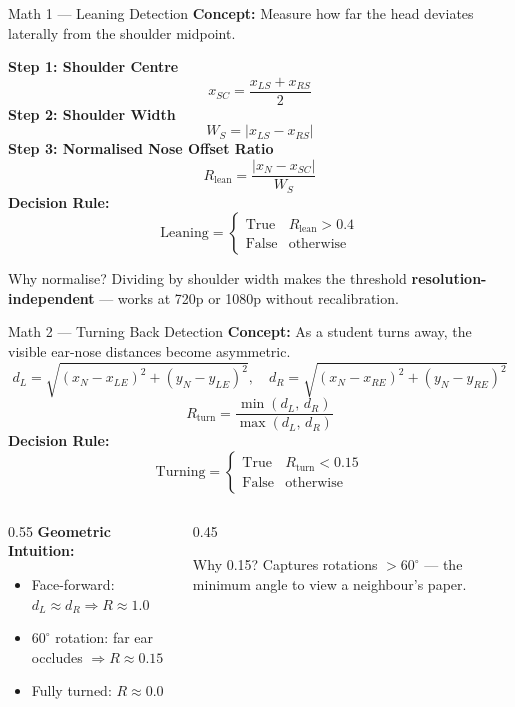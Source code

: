 \documentclass{beamer}
\begin{document}
\begin{frame}{Math 1 --- Leaning Detection}
\textbf{Concept:} Measure how far the head deviates laterally from the shoulder midpoint.
\vspace{0.25cm}

\textbf{Step 1: Shoulder Centre}
\[ x_{SC} = \frac{x_{LS} + x_{RS}}{2} \]
\textbf{Step 2: Shoulder Width}
\[ W_S = |x_{LS} - x_{RS}| \]
\textbf{Step 3: Normalised Nose Offset Ratio}
\[ \boxed{R_{\text{lean}} = \frac{|x_N - x_{SC}|}{W_S}} \]
\textbf{Decision Rule:}
\[ \text{Leaning} = \begin{cases} \text{True} & R_{\text{lean}} > 0.4 \\ \text{False} & \text{otherwise} \end{cases} \]
\begin{alertblock}{Why normalise?}
Dividing by shoulder width makes the threshold \textbf{resolution-independent} --- works at 720p or 1080p without recalibration.
\end{alertblock}
\end{frame}

\begin{frame}{Math 2 --- Turning Back Detection}
\textbf{Concept:} As a student turns away, the visible ear-nose distances become asymmetric.
\vspace{0.2cm}
\[ d_L = \sqrt{(x_N-x_{LE})^2+(y_N-y_{LE})^2},\quad d_R = \sqrt{(x_N-x_{RE})^2+(y_N-y_{RE})^2} \]
\[ \boxed{R_{\text{turn}} = \frac{\min(d_L,\,d_R)}{\max(d_L,\,d_R)}} \]
\textbf{Decision Rule:}
\[ \text{Turning} = \begin{cases} \text{True} & R_{\text{turn}} < 0.15 \\ \text{False} & \text{otherwise} \end{cases} \]
\begin{columns}
\begin{column}{0.55\textwidth}
\footnotesize \textbf{Geometric Intuition:}
\begin{itemize}
    \item Face-forward: $d_L \approx d_R \Rightarrow R \approx 1.0$
    \item $60^\circ$ rotation: far ear occludes $\Rightarrow R \approx 0.15$
    \item Fully turned: $R \approx 0.0$
\end{itemize}
\end{column}
\begin{column}{0.45\textwidth}
\begin{block}{Why 0.15?}
Captures rotations $>60^\circ$ --- the minimum angle to view a neighbour's paper.
\end{block}
\end{column}
\end{columns}
\end{frame}
\end{document}
